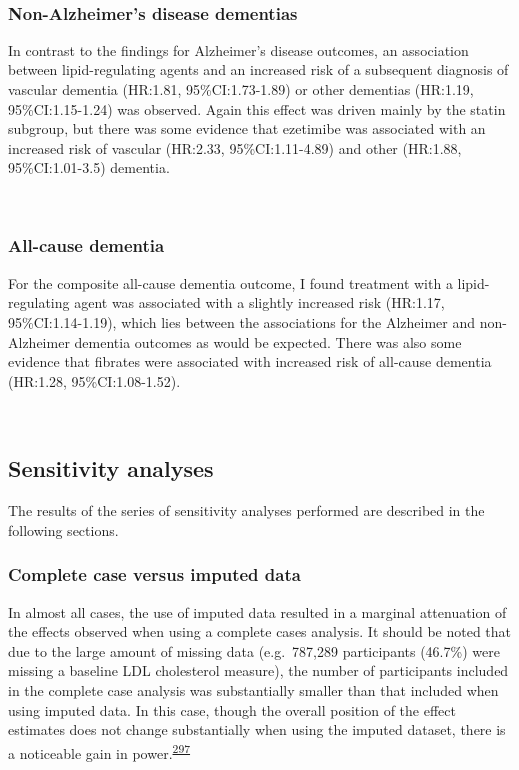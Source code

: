 \documentclass[a4paper, twoside]{templates/ociamthesis}
\begin{document}
~

\hypertarget{non-alzheimers-disease-dementias}{%
\subsubsection{Non-Alzheimer's disease dementias}\label{non-alzheimers-disease-dementias}}

In contrast to the findings for Alzheimer's disease outcomes, an association between lipid-regulating agents and an increased risk of a subsequent diagnosis of vascular dementia (HR:1.81, 95\%CI:1.73-1.89) or other dementias (HR:1.19, 95\%CI:1.15-1.24) was observed. Again this effect was driven mainly by the statin subgroup, but there was some evidence that ezetimibe was associated with an increased risk of vascular (HR:2.33, 95\%CI:1.11-4.89) and other (HR:1.88, 95\%CI:1.01-3.5) dementia.

~

\hypertarget{all-cause-dementia}{%
\subsubsection{All-cause dementia}\label{all-cause-dementia}}

For the composite all-cause dementia outcome, I found treatment with a lipid-regulating agent was associated with a slightly increased risk (HR:1.17, 95\%CI:1.14-1.19), which lies between the associations for the Alzheimer and non-Alzheimer dementia outcomes as would be expected. There was also some evidence that fibrates were associated with increased risk of all-cause dementia (HR:1.28, 95\%CI:1.08-1.52).

~

\hypertarget{sensitivity-analyses-1}{%
\subsection{Sensitivity analyses}\label{sensitivity-analyses-1}}

The results of the series of sensitivity analyses performed are described in the following sections.

\hypertarget{complete-case-versus-imputed-data}{%
\subsubsection{Complete case versus imputed data}\label{complete-case-versus-imputed-data}}

In almost all cases, the use of imputed data resulted in a marginal attenuation of the effects observed when using a complete cases analysis. It should be noted that due to the large amount of missing data (e.g.~787,289 participants (46.7\%) were missing a baseline LDL cholesterol measure), the number of participants included in the complete case analysis was substantially smaller than that included when using imputed data. In this case, though the overall position of the effect estimates does not change substantially when using the imputed dataset, there is a noticeable gain in power.\textsuperscript{\protect\hyperlink{ref-sterne2009}{297}}
\end{document}
